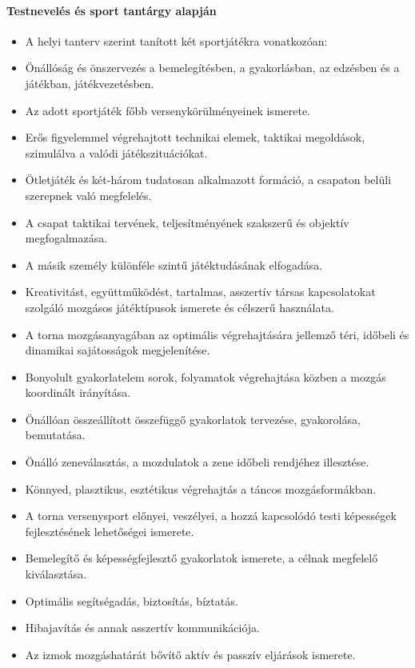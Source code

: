 \paragraph{Testnevelés és sport tantárgy alapján}
\begin{itemize}
\item A helyi tanterv szerint tanított két sportjátékra vonatkozóan:
\item Önállóság és önszervezés a bemelegítésben, a gyakorlásban, az edzésben és a játékban, játékvezetésben.
\item Az adott sportjáték főbb versenykörülményeinek ismerete.
\item Erős figyelemmel végrehajtott technikai elemek, taktikai megoldások, szimulálva a valódi játékszituációkat.
\item Ötletjáték és két-három tudatosan alkalmazott formáció, a csapaton belüli szerepnek való megfelelés.
\item A csapat taktikai tervének, teljesítményének szakszerű és objektív megfogalmazása.
\item A másik személy különféle szintű játéktudásának elfogadása.
\item Kreativitást, együttműködést, tartalmas, asszertív társas kapcsolatokat szolgáló mozgásos játéktípusok ismerete és célszerű használata.
\item A torna mozgásanyagában az optimális végrehajtására jellemző téri, időbeli és dinamikai sajátosságok megjelenítése.
\item Bonyolult gyakorlatelem sorok, folyamatok végrehajtása közben a mozgás koordinált irányítása.
\item Önállóan összeállított összefüggő gyakorlatok tervezése, gyakorolása, bemutatása.
\item Önálló zeneválasztás, a mozdulatok a zene időbeli rendjéhez illesztése.
\item Könnyed, plasztikus, esztétikus végrehajtás a táncos mozgásformákban.
\item A torna versenysport előnyei, veszélyei, a hozzá kapcsolódó testi képességek fejlesztésének lehetőségei ismerete.
\item Bemelegítő és képességfejlesztő gyakorlatok ismerete, a célnak megfelelő kiválasztása.
\item Optimális segítségadás, biztosítás, bíztatás.
\item Hibajavítás és annak asszertív kommunikációja.
\item Az izmok mozgáshatárát bővítő aktív és passzív eljárások ismerete.

\end{itemize}
